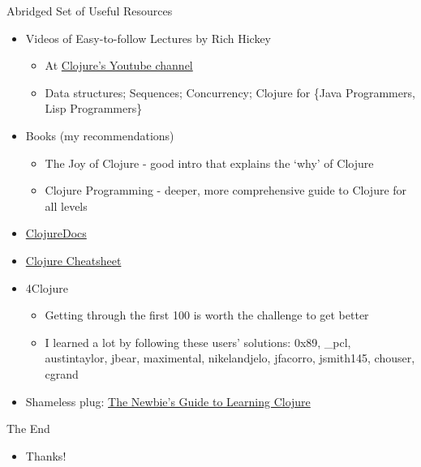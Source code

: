 \documentclass{beamer}
\renewcommand{\textquotedbl}{\texttt{\char`\"}}
\begin{document}
\begin{frame}{Abridged Set of Useful Resources}
  \begin{itemize}
  \item Videos of Easy-to-follow Lectures by Rich Hickey
    \begin{itemize}
    \item At \href{http://www.youtube.com/clojuretv}{Clojure's
      Youtube channel}
    \item Data structures; Sequences; Concurrency; Clojure for \{Java Programmers, Lisp Programmers\}
    \end{itemize}
  \item Books (my recommendations)
    \begin{itemize}
    \item The Joy of Clojure - good intro that explains the `why' of Clojure
    \item Clojure Programming - deeper, more comprehensive guide to Clojure
      for all levels
    \end{itemize}
  \item \href{http://clojuredocs.org/}{ClojureDocs}
  \item \href{http://clojure.org/cheatsheet}{Clojure Cheatsheet}
  \item 4Clojure
    \begin{itemize}
    \item Getting through the first 100 is worth the challenge to get
      better
    \item I learned a lot by following these users' solutions: 0x89, \_pcl, austintaylor, jbear, maximental, nikelandjelo, jfacorro, jsmith145, chouser, cgrand
    \end{itemize}
  \item Shameless plug:
    \href{http://www.elangocheran.com/blog/2012/03/the-newbies-guide-learning-clojure/}{The
    Newbie's Guide to Learning Clojure}
  \end{itemize}
\end{frame}

\begin{frame}{The End}
  \begin{itemize}
  \item Thanks!
  \end{itemize}
\end{frame}


\end{document}
